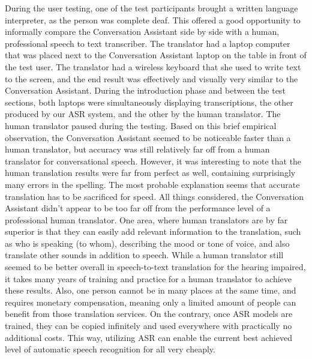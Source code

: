 \documentclass[english, 12pt, a4paper, pdftex, elec, utf8]{aaltothesis}
\begin{document}
During the user testing, one of the test participants brought a written language interpreter, as the person was complete deaf. This offered a good opportunity to informally compare the Conversation Assistant side by side with a human, professional speech to text transcriber. The translator had a laptop computer that was placed next to the Conversation Assistant laptop on the table in front of the test user. The translator had a wireless keyboard that she used to write text to the screen, and the end result was effectively and visually very similar to the Conversation Assistant. During the introduction phase and between the test sections, both laptops were simultaneously displaying transcriptions, the other produced by our ASR system, and the other by the human translator. The human translator paused during the testing. Based on this brief empirical observation, the Conversation Assistant seemed to be noticeable faster than a human translator, but accuracy was still relatively far off from a human translator for conversational speech. However, it was interesting to note that the human translation results were far from perfect as well, containing surprisingly many errors in the spelling. The most probable explanation seems that accurate translation has to be sacrificed for speed. All things considered, the Conversation Assistant didn't appear to be too far off from the performance level of a professional human translator. One area, where human translators are by far superior is that they can easily add relevant information to the translation, such as who is speaking (to whom), describing the mood or tone of voice, and also translate other sounds in addition to speech. While a human translator still seemed to be better overall in speech-to-text translation for the hearing impaired, it takes many years of training and practice for a human translator to achieve these results. Also, one person cannot be in many places at the same time, and requires monetary compensation, meaning only a limited amount of people can benefit from those translation services. On the contrary, once ASR models are trained, they can be copied infinitely and used everywhere with practically no additional costs. This way, utilizing ASR can enable the current best achieved level of automatic speech recognition for all very cheaply. \\\\
\end{document}
